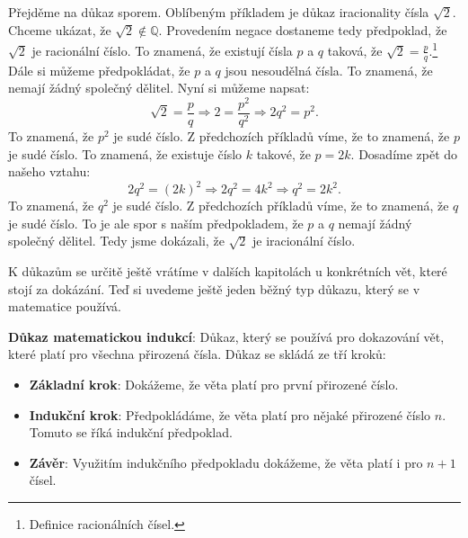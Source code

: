 \begin{example}
  Přejděme na důkaz sporem. Oblíbeným příkladem je důkaz iracionality čísla $\sqrt{2}$. Chceme ukázat, že $\sqrt{2}\notin\mathbb{Q}$. Provedením negace dostaneme tedy předpoklad, že $\sqrt{2}$ je racionální číslo. To znamená, že existují čísla $p$ a $q$ taková, že $\sqrt{2} = \frac{p}{q}$.\footnote{Definice racionálních čísel.} Dále si můžeme předpokládat, že $p$ a $q$ jsou nesoudělná čísla. To znamená, že nemají žádný společný dělitel. Nyní si můžeme napsat:
  \begin{equation}
    \sqrt{2} = \frac{p}{q} \Rightarrow 2 = \frac{p^2}{q^2} \Rightarrow 2q^2 = p^2.
  \end{equation}
  To znamená, že $p^2$ je sudé číslo. Z předchozích příkladů víme, že to znamená, že $p$ je sudé číslo. To znamená, že existuje číslo $k$ takové, že $p = 2k$. Dosadíme zpět do našeho vztahu:
  \begin{equation}
    2q^2 = (2k)^2 \Rightarrow 2q^2 = 4k^2 \Rightarrow q^2 = 2k^2.
  \end{equation}
  To znamená, že $q^2$ je sudé číslo. Z předchozích příkladů víme, že to znamená, že $q$ je sudé číslo. To je ale spor s naším předpokladem, že $p$ a $q$ nemají žádný společný dělitel. Tedy jsme dokázali, že $\sqrt{2}$ je iracionální číslo.
\end{example}
\begin{definitionbox}
  K důkazům se určitě ještě vrátíme v dalších kapitolách u konkrétních vět, které stojí za dokázání. Teď si uvedeme ještě jeden běžný typ důkazu, který se v matematice používá.

  \vspace{0.2cm}

  \textbf{Důkaz matematickou indukcí}: Důkaz, který se používá pro dokazování vět, které platí pro všechna přirozená čísla. Důkaz se skládá ze tří kroků:
  \begin{itemize}
    \item \textbf{Základní krok}: Dokážeme, že věta platí pro první přirozené číslo.
    \item \textbf{Indukční krok}: Předpokládáme, že věta platí pro nějaké přirozené číslo $n$. Tomuto se říká indukční předpoklad.
    \item \textbf{Závěr}: Využitím indukčního předpokladu dokážeme, že věta platí i pro $n+1$ čísel.
  \end{itemize}
\end{definitionbox}

